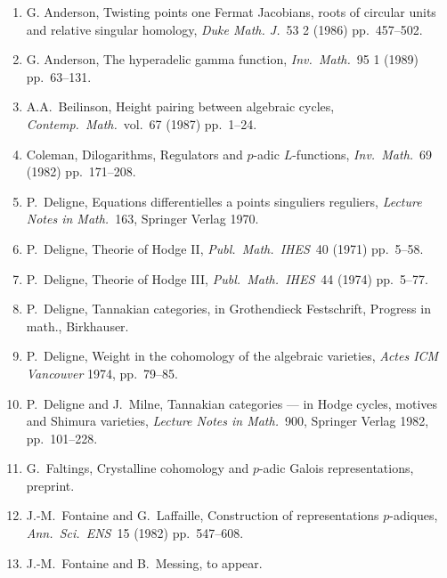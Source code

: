 \documentclass[12pt,a4paper]{article}
\theoremstyle{plain}
\theoremstyle{definition}
\theoremstyle{remark}
\begin{document}
\begin{enumerate}
\item[{[A1]}] G. Anderson, Twisting points one Fermat Jacobians, roots of
circular units and relative singular homology, \textit{Duke Math.
J.}\ 53 2 (1986) pp.\ 457--502.

\item[{[A2]}] G. Anderson, The hyperadelic gamma function,
\textit{Inv.\ Math.}\ 95 1 (1989) pp.\ 63--131.

\item[{[B]}] A.A.\ Beilinson, Height pairing between algebraic cycles,
\textit{Contemp.\ Math.}\ vol.\ 67 (1987) pp.\ 1--24.

\item[{[C]}] Coleman, Dilogarithms, Regulators and $p$-adic
$L$-functions, \textit{Inv.\ Math.}\ 69 (1982) pp.\ 171--208.

\item[{[D1]}] P.\ Deligne, Equations differentielles a points
singuliers reguliers, \textit{Lecture Notes in Math.}\ 163, Springer
Verlag 1970.

\item[{[D2]}] P.\ Deligne, Theorie of Hodge II, \textit{Publ.\ Math.\ IHES}\ 40 (1971) pp.\ 5--58.

\item[{[D3]}] P.\ Deligne, Theorie of Hodge III, \textit{Publ.\ Math.\ IHES}\ 44 (1974) pp.\ 5--77.

\item[{[D4]}] P.\ Deligne, Tannakian categories, in Grothendieck
Festschrift, Progress in math., Birkhauser.

\item[{[D5]}] P.\ Deligne, Weight in the cohomology of the algebraic varieties, \textit{Actes ICM Vancouver} 1974, pp.\ 79--85.

\item[{[DM]}] P.\ Deligne and J.\ Milne, Tannakian categories --- in
Hodge cycles, motives and Shimura varieties, \textit{Lecture Notes in
Math.}\ 900, Springer Verlag 1982, pp.\ 101--228.

\item[{[Fa]}] G.\ Faltings, Crystalline cohomology and $p$-adic Galois
representations, preprint.

\item[{[FL]}] J.-M.\ Fontaine and G.\ Laffaille, Construction of
representations $p$-adiques, \textit{Ann.\ Sci.\ ENS}\ 15 (1982) pp.\ 547--608.

\item[{[FM]}] J.-M.\ Fontaine and B.\ Messing, to appear.


\end{enumerate}
\end{document}
